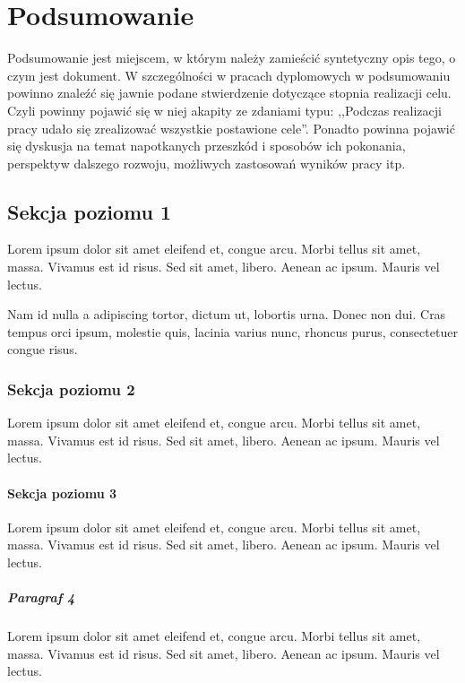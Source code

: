 
\chapter{Podsumowanie}
\label{chap:podsumowanie}
Podsumowanie jest miejscem, w którym należy zamieścić syntetyczny opis tego, o czym jest dokument. W szczególności w pracach dyplomowych w podsumowaniu powinno znaleźć się jawnie podane stwierdzenie dotyczące stopnia realizacji celu. Czyli powinny pojawić się w niej akapity ze zdaniami typu: ,,Podczas realizacji pracy udało się zrealizować wszystkie postawione cele''. Ponadto powinna pojawić się dyskusja na temat napotkanych przeszkód i sposobów ich pokonania, perspektyw dalszego rozwoju, możliwych zastosowań wyników pracy itp. 

\section{Sekcja poziomu 1}%
Lorem ipsum dolor sit amet eleifend et, congue arcu. Morbi tellus sit amet, massa. Vivamus est id risus. Sed sit amet, libero. Aenean ac ipsum. Mauris vel lectus. 

Nam id nulla a adipiscing tortor, dictum ut, lobortis urna. Donec non dui. Cras tempus orci ipsum, molestie quis, lacinia varius nunc, rhoncus purus, consectetuer congue risus. 

\subsection{Sekcja poziomu 2}
Lorem ipsum dolor sit amet eleifend et, congue arcu. Morbi tellus sit amet, massa. Vivamus est id risus. Sed sit amet, libero. Aenean ac ipsum. Mauris vel lectus. 
\subsubsection{Sekcja poziomu 3}
Lorem ipsum dolor sit amet eleifend et, congue arcu. Morbi tellus sit amet, massa. Vivamus est id risus. Sed sit amet, libero. Aenean ac ipsum. Mauris vel lectus. 
\paragraph{Paragraf 4}
Lorem ipsum dolor sit amet eleifend et, congue arcu. Morbi tellus sit amet, massa. Vivamus est id risus. Sed sit amet, libero. Aenean ac ipsum. Mauris vel lectus. 
